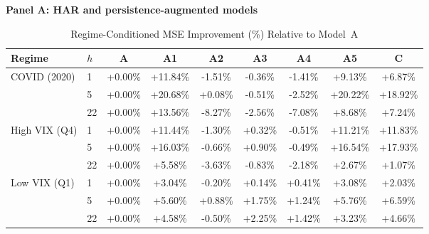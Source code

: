 
\begin{table}[htbp]
\centering
\caption{Regime-Conditioned MSE Improvement (\%) Relative to Model~A}
\label{tab:regime_split}
\footnotesize
\setlength{\tabcolsep}{3pt}
\textbf{Panel A: HAR and persistence-augmented models}\par\smallskip
\begin{tabular*}{\linewidth}{@{\extracolsep{\fill}}llccccccc@{}}
\toprule
Regime & $h$ & A & A1 & A2 & A3 & A4 & A5 & C \\
\midrule
COVID (2020) & 1 & +0.00\% & +11.84\% & -1.51\% & -0.36\% & -1.41\% & +9.13\% & +6.87\% \\
 & 5 & +0.00\% & +20.68\% & +0.08\% & -0.51\% & -2.52\% & +20.22\% & +18.92\% \\
 & 22 & +0.00\% & +13.56\% & -8.27\% & -2.56\% & -7.08\% & +8.68\% & +7.24\% \\
High VIX (Q4) & 1 & +0.00\% & +11.44\% & -1.30\% & +0.32\% & -0.51\% & +11.21\% & +11.83\% \\
 & 5 & +0.00\% & +16.03\% & -0.66\% & +0.90\% & -0.49\% & +16.54\% & +17.93\% \\
 & 22 & +0.00\% & +5.58\% & -3.63\% & -0.83\% & -2.18\% & +2.67\% & +1.07\% \\
Low VIX (Q1) & 1 & +0.00\% & +3.04\% & -0.20\% & +0.14\% & +0.41\% & +3.08\% & +2.03\% \\
 & 5 & +0.00\% & +5.60\% & +0.88\% & +1.75\% & +1.24\% & +5.76\% & +6.59\% \\
 & 22 & +0.00\% & +4.58\% & -0.50\% & +2.25\% & +1.42\% & +3.23\% & +4.66\% \\
\bottomrule
\end{tabular*}


\end{table}

